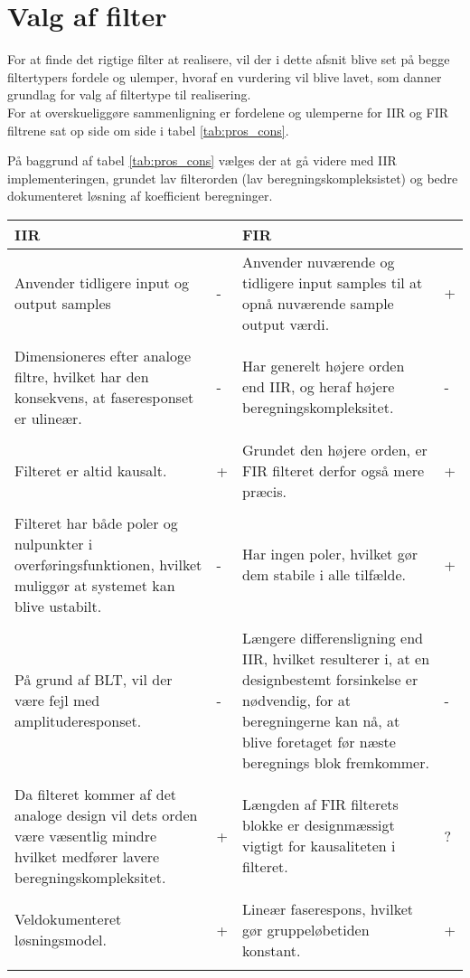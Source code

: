 \section{Valg af filter}\label{sec:dec_filter}
For at finde det rigtige filter at realisere, vil der i dette afsnit blive set på begge filtertypers fordele og ulemper, hvoraf en vurdering vil blive lavet, som danner grundlag for valg af filtertype til realisering. \\
For at overskueliggøre sammenligning er fordelene og ulemperne for IIR og FIR filtrene sat op side om side i tabel \ref{tab:pros_cons}.

På baggrund af tabel \ref{tab:pros_cons} vælges der at gå videre med IIR implementeringen, grundet lav filterorden (lav beregningskompleksistet) og bedre dokumenteret løsning af koefficient beregninger.

\begin{table*}[ht]
\caption{Fordele og ulemper for IIR og FIR}
\centering
\label{tab:pros_cons}
\begin{tabular}{p{0.45\linewidth}p{0.05\linewidth}p{0.45\linewidth}p{0.05\linewidth}}
\toprule
IIR &  &FIR & \\
\midrule 
Anvender tidligere input og output samples & - & Anvender nuværende og tidligere input samples til at opnå nuværende sample output værdi. & + \\
& & & \\
Dimensioneres efter analoge filtre, hvilket har den konsekvens, at faseresponset er ulineær. & - & Har generelt højere orden end IIR, og heraf højere beregningskompleksitet. & - \\ 
& & & \\
Filteret er altid kausalt. & + & Grundet den højere orden, er FIR filteret derfor også mere præcis. & + \\	
& & & \\
Filteret har både poler og nulpunkter i overføringsfunktionen, hvilket muliggør at systemet kan blive ustabilt. & - & Har ingen poler, hvilket gør dem stabile i alle tilfælde. & + \\
& & & \\
På grund af BLT, vil der være fejl med amplituderesponset. & - & Længere differensligning end IIR, hvilket resulterer i, at en designbestemt forsinkelse er nødvendig, for at beregningerne kan nå, at blive foretaget før næste beregnings blok fremkommer. & - \\
& & & \\
Da filteret kommer af det analoge design vil dets orden være væsentlig mindre hvilket medfører lavere beregningskompleksitet. & + & Længden af FIR filterets blokke er designmæssigt vigtigt for kausaliteten i filteret. & ? \\
& & & \\
Veldokumenteret løsningsmodel. & + & Lineær faserespons, hvilket gør gruppeløbetiden konstant. & + \\
& & & \\
\bottomrule	
\end{tabular}
\end{table*}
\FloatBlock



